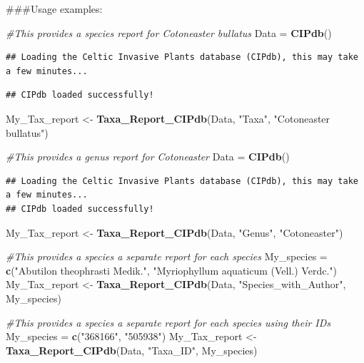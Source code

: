 \documentclass[
]{article}
\newenvironment{Shaded}{\begin{snugshade}}{\end{snugshade}}
\newcommand{\CommentTok}[1]{\textcolor[rgb]{0.56,0.35,0.01}{\textit{#1}}}
\newcommand{\FunctionTok}[1]{\textcolor[rgb]{0.13,0.29,0.53}{\textbf{#1}}}
\newcommand{\NormalTok}[1]{#1}
\newcommand{\OtherTok}[1]{\textcolor[rgb]{0.56,0.35,0.01}{#1}}
\newcommand{\StringTok}[1]{\textcolor[rgb]{0.31,0.60,0.02}{#1}}
\begin{document}
\#\#\#Usage examples:

\begin{Shaded}
\begin{Highlighting}[]
\CommentTok{\#This provides a species report for Cotoneaster bullatus}
\NormalTok{Data }\OtherTok{=} \FunctionTok{CIPdb}\NormalTok{()}
\end{Highlighting}
\end{Shaded}

\begin{verbatim}
## Loading the Celtic Invasive Plants database (CIPdb), this may take a few minutes...
\end{verbatim}

\begin{verbatim}
## CIPdb loaded successfully!
\end{verbatim}

\begin{Shaded}
\begin{Highlighting}[]
\NormalTok{My\_Tax\_report }\OtherTok{\textless{}{-}} \FunctionTok{Taxa\_Report\_CIPdb}\NormalTok{(Data, }\StringTok{"Taxa"}\NormalTok{, }\StringTok{"Cotoneaster bullatus"}\NormalTok{)}

\CommentTok{\#This provides a genus report for Cotoneaster}
\NormalTok{Data }\OtherTok{=} \FunctionTok{CIPdb}\NormalTok{()}
\end{Highlighting}
\end{Shaded}

\begin{verbatim}
## Loading the Celtic Invasive Plants database (CIPdb), this may take a few minutes...
## CIPdb loaded successfully!
\end{verbatim}

\begin{Shaded}
\begin{Highlighting}[]
\NormalTok{My\_Tax\_report }\OtherTok{\textless{}{-}} \FunctionTok{Taxa\_Report\_CIPdb}\NormalTok{(Data, }\StringTok{"Genus"}\NormalTok{, }\StringTok{"Cotoneaster"}\NormalTok{)}

\CommentTok{\#This provides a species a separate report for each species}
\NormalTok{My\_species }\OtherTok{=} \FunctionTok{c}\NormalTok{(}\StringTok{"Abutilon theophrasti Medik."}\NormalTok{, }\StringTok{"Myriophyllum aquaticum (Vell.) Verdc."}\NormalTok{)}
\NormalTok{My\_Tax\_report }\OtherTok{\textless{}{-}} \FunctionTok{Taxa\_Report\_CIPdb}\NormalTok{(Data, }\StringTok{"Species\_with\_Author"}\NormalTok{, My\_species)}

\CommentTok{\#This provides a species a separate report for each species using their IDs}
\NormalTok{My\_species }\OtherTok{=} \FunctionTok{c}\NormalTok{(}\StringTok{"368166"}\NormalTok{, }\StringTok{"505938"}\NormalTok{)}
\NormalTok{My\_Tax\_report }\OtherTok{\textless{}{-}} \FunctionTok{Taxa\_Report\_CIPdb}\NormalTok{(Data, }\StringTok{"Taxa\_ID"}\NormalTok{, My\_species)}
\end{Highlighting}
\end{Shaded}
\end{document}
